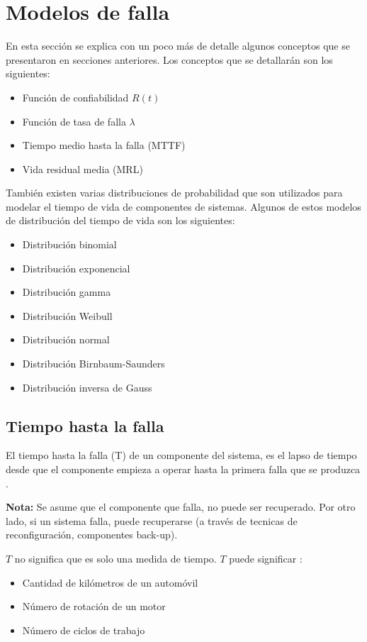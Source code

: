 \section{Modelos de falla}\label{sec:modelos_fallas}
En esta sección se explica con un poco más de detalle algunos conceptos que se presentaron en secciones anteriores. Los conceptos que se detallarán son los siguientes:

\begin{itemize}
  \item Función de confiabilidad $R(t)$
  \item Función de tasa de falla $\lambda$
  \item Tiempo medio hasta la falla (MTTF)
  \item Vida residual media (MRL)
\end{itemize}

También existen varias distribuciones de probabilidad que son utilizados para modelar el tiempo de vida de componentes de sistemas. Algunos de estos modelos de distribución del tiempo de vida son los siguientes:

\begin{itemize}
  \item Distribución binomial
  \item Distribución exponencial
  \item Distribución gamma
  \item Distribución Weibull
  \item Distribución normal
  \item Distribución Birnbaum-Saunders
  \item Distribución inversa de Gauss
\end{itemize}

\subsection{Tiempo hasta la falla}
El tiempo hasta la falla (T) de un componente del sistema, es el lapso de tiempo desde que el componente empieza a operar hasta la primera falla que se produzca \citep{Rausand04}.

\textbf{Nota: } Se asume que el componente que falla, no puede ser recuperado. Por otro lado, si un sistema falla, puede recuperarse (a través de tecnicas de reconfiguración, componentes back-up).

$T$ no significa que es solo una medida de tiempo. $T$ puede significar \citep{Rausand04}:
\begin{itemize}
  \item Cantidad de kilómetros de un automóvil
  \item Número de rotación de un motor
  \item Número de ciclos de trabajo
\end{itemize}


